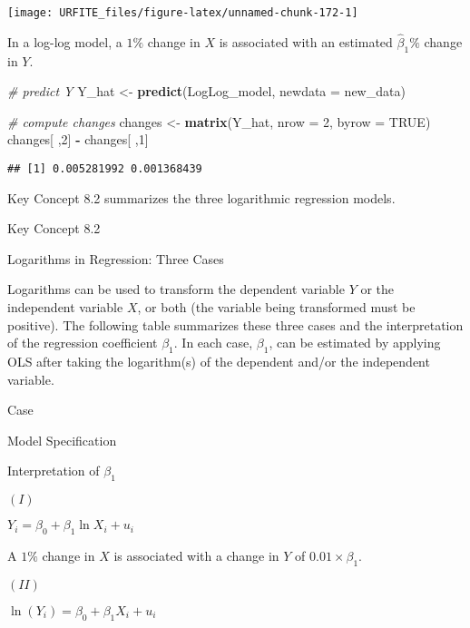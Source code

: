 \documentclass[]{book}
\newenvironment{Shaded}{\begin{snugshade}}{\end{snugshade}}
\newcommand{\KeywordTok}[1]{\textcolor[rgb]{0.13,0.29,0.53}{\textbf{#1}}}
\newcommand{\DataTypeTok}[1]{\textcolor[rgb]{0.13,0.29,0.53}{#1}}
\newcommand{\DecValTok}[1]{\textcolor[rgb]{0.00,0.00,0.81}{#1}}
\newcommand{\StringTok}[1]{\textcolor[rgb]{0.31,0.60,0.02}{#1}}
\newcommand{\CommentTok}[1]{\textcolor[rgb]{0.56,0.35,0.01}{\textit{#1}}}
\newcommand{\OtherTok}[1]{\textcolor[rgb]{0.56,0.35,0.01}{#1}}
\newcommand{\OperatorTok}[1]{\textcolor[rgb]{0.81,0.36,0.00}{\textbf{#1}}}
\newcommand{\NormalTok}[1]{#1}
\theoremstyle{definition}
\theoremstyle{definition}
\theoremstyle{definition}
\theoremstyle{remark}
\begin{document}
\begin{center}\texttt{[image: URFITE\_files/figure-latex/unnamed-chunk-172-1]} \end{center}

In a log-log model, a \(1\%\) change in \(X\) is associated with an
estimated \(\hat\beta_1 \%\) change in \(Y\).

\begin{Shaded}
\begin{Highlighting}[]
\CommentTok{# predict Y}
\NormalTok{Y_hat <-}\StringTok{ }\KeywordTok{predict}\NormalTok{(LogLog_model, }\DataTypeTok{newdata =}\NormalTok{ new_data)}

\CommentTok{# compute changes}
\NormalTok{changes <-}\StringTok{ }\KeywordTok{matrix}\NormalTok{(Y_hat, }\DataTypeTok{nrow =} \DecValTok{2}\NormalTok{, }\DataTypeTok{byrow =} \OtherTok{TRUE}\NormalTok{)}
\NormalTok{changes[ ,}\DecValTok{2}\NormalTok{] }\OperatorTok{-}\StringTok{ }\NormalTok{changes[ ,}\DecValTok{1}\NormalTok{]}
\end{Highlighting}
\end{Shaded}

\begin{verbatim}
## [1] 0.005281992 0.001368439
\end{verbatim}

Key Concept 8.2 summarizes the three logarithmic regression models.

Key Concept 8.2

Logarithms in Regression: Three Cases

Logarithms can be used to transform the dependent variable \(Y\) or the
independent variable \(X\), or both (the variable being transformed must
be positive). The following table summarizes these three cases and the
interpretation of the regression coefficient \(\beta_1\). In each case,
\(\beta_1\), can be estimated by applying OLS after taking the
logarithm(s) of the dependent and/or the independent variable.

Case

Model Specification

Interpretation of \(\beta_1\)

\((I)\)

\(Y_i = \beta_0 + \beta_1 \ln{X_i} + u_i\)

A \(1 \%\) change in \(X\) is associated with a change in \(Y\) of
\(0.01 \times \beta_1\).

\((II)\)

\(\ln(Y_i) = \beta_0 + \beta_1 X_i + u_i\)
\end{document}

